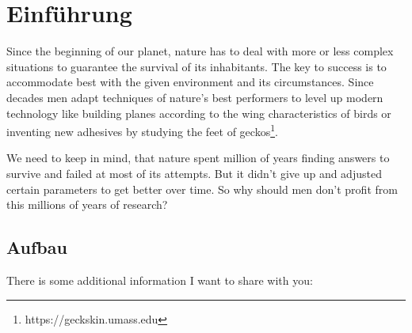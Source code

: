 \chapter{Einführung}

Since the beginning of our planet, nature has to deal with more or less complex
situations to guarantee the survival of its inhabitants. The key to success is to
accommodate best with the given environment and its circumstances. Since decades
men adapt techniques of nature's best performers to level up modern technology like
building planes according to the wing characteristics of birds or inventing new
adhesives by studying the feet of geckos\footnote{https://geckskin.umass.edu}.

We need to keep in mind, that nature spent million of years finding answers to survive
and failed at most of its attempts. But it didn't give up and adjusted certain parameters
to get better over time. So why should men don't profit from this millions of years
of research?

\section{Aufbau}

There is some additional information I want to share with you: